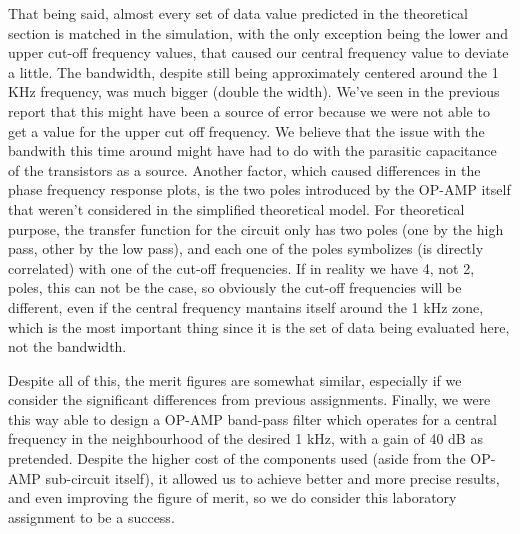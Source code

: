 That being said, almost every set of data value predicted in the theoretical section is matched in the simulation, with the only exception being the lower and upper cut-off frequency values, that caused our central frequency value to deviate a little. The bandwidth, despite still being approximately centered around the 1 KHz frequency, was much bigger (double the width). We've seen in the previous report that this might have been a source of error because we were not able to get a value for the upper cut off frequency. We believe that the issue with the bandwith this time around might have had to do with the parasitic capacitance of the transistors as a source. Another factor, which caused differences in the phase frequency response plots, is the two poles introduced by the OP-AMP itself that weren't considered in the simplified theoretical model. For theoretical purpose, the transfer function for the circuit only has two poles (one by the high pass, other by the low pass), and each one of the poles symbolizes (is directly correlated) with one of the cut-off frequencies. If in reality we have 4, not 2, poles, this can not be the case, so obviously the cut-off frequencies will be different, even if the central frequency mantains itself around the 1 kHz zone, which is the most important thing since it is the set of data being evaluated here, not the bandwidth.

Despite all of this, the merit figures are somewhat similar, especially if we consider the significant differences from previous assignments. Finally, we were this way able to design a OP-AMP band-pass filter which operates for a central frequency in the neighbourhood of the desired 1 kHz, with a gain of 40 dB as pretended. Despite the higher cost of the components used (aside from the OP-AMP sub-circuit itself), it allowed us to achieve better and more precise results, and even improving the figure of merit, so we do consider this laboratory assignment to be a success.
